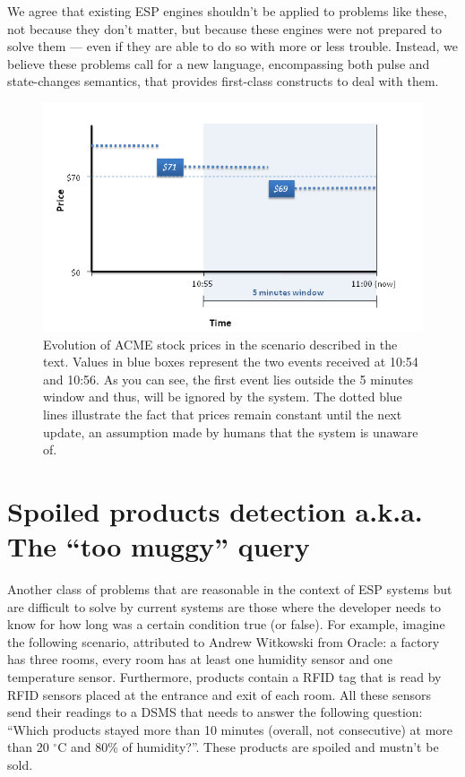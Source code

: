 \documentclass{report}
\begin{document}
We agree that existing ESP engines shouldn't be applied to problems
like these, not because they don't matter, but because these engines
were not prepared to solve them --- even if they are able to do so
with more or less trouble. Instead, we believe these problems call for
a new language, encompassing both pulse and state-changes semantics,
that provides first-class constructs to deal with them.


\begin{figure}[htbp]
  \includegraphics[width=\textwidth]{outside-window.png}
  \caption{Evolution of ACME stock prices in the scenario described in
    the text. Values in blue boxes represent the two events received
    at 10:54 and 10:56. As you can see, the first event lies outside
    the 5 minutes window and thus, will be ignored by the system. The
    dotted blue lines illustrate the fact that prices remain constant
    until the next update, an assumption made by humans that the
    system is unaware of.}
  \label{fig:outside-window}
\end{figure}


\section{Spoiled products detection a.k.a. The ``too muggy'' query}
\label{sec:spoiled-products}


Another class of problems that are reasonable in the context of ESP
systems but are difficult to solve by current systems are those where
the developer needs to know for how long was a certain condition true
(or false). For example, imagine the following scenario, attributed to
Andrew Witkowski from Oracle: a factory has three rooms, every room
has at least one humidity sensor and one temperature
sensor. Furthermore, products contain a RFID tag that is read by RFID
sensors placed at the entrance and exit of each room. All these
sensors send their readings to a DSMS that needs to answer the
following question: ``Which products stayed more than 10 minutes
(overall, not consecutive) at more than 20 $^{\circ}$C and 80\% of
humidity?''. These products are spoiled and mustn't be sold.
\end{document}

